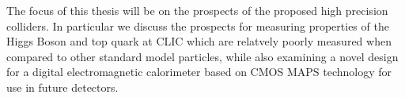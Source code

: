 The focus of this thesis will be on the prospects of the proposed high precision colliders. In particular we discuss the prospects for measuring properties of the Higgs Boson and top quark at \ac{CLIC} which are relatvely poorly measured when compared to other standard model particles, while also examining a novel design for a digital electromagnetic calorimeter based on \ac{CMOS} \ac{MAPS} technology for use in future detectors.  


 